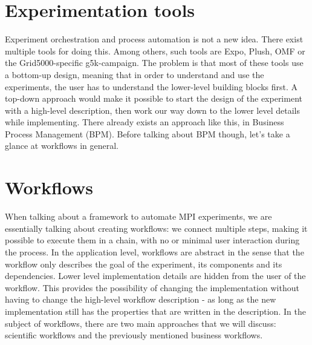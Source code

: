 \section{Experimentation tools}
Experiment orchestration and process automation is not a new
idea. There exist multiple tools for doing this. Among others, such
tools are Expo\cite{vr08}, Plush, OMF\cite{rosj09} or the
Grid5000-specific g5k-campaign. The problem is that most of these
tools use a bottom-up design, meaning that in order to understand and
use the experiments, the user has to understand the lower-level
building blocks first. A top-down approach would make it possible to
start the design of the experiment with a high-level description, then
work our way down to the lower level details while implementing. There
already exists an approach like this, in Business Process
Management (BPM).\cite{bn12_2} Before talking about BPM though, let's
take a glance at workflows in general.
\section{Workflows}
When talking about a framework to automate MPI experiments, we are
essentially talking about creating workflows: we connect multiple
steps, making it possible to execute them in a chain, with no or
minimal user interaction during the process. In the application level,
workflows are abstract in the sense that the workflow only describes
the goal of the experiment, its components and its dependencies. Lower
level implementation details are hidden from the user of the
workflow. This provides the possibility of changing the implementation
without having to change the high-level workflow description - as long
as the new implementation still has the properties that are written in
the description.\cite{dssbgkmvbgljk05}
In the subject of workflows, there are two main approaches that we
will discuss: scientific workflows and the previously mentioned
business workflows.
